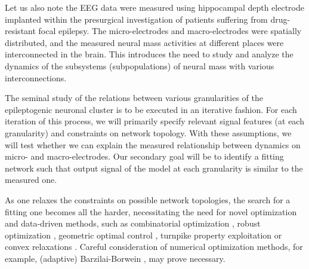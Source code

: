 \documentclass[a4paper,11pt]{scrartcl}
\begin{document}
Let us also note the EEG data \cite{Brazdil2017} were measured using hippocampal depth electrode implanted within the presurgical investigation of patients suffering from drug-resistant focal epilepsy. The micro-electrodes and macro-electrodes were spatially distributed, and the measured neural mass activities at different places were interconnected in the brain. This introduces the need to study and analyze the dynamics of the subsystems (subpopulations) of neural mass with various interconnections.

The seminal study of the relations between various granularities of the epileptogenic neuronal cluster is to be executed in an iterative fashion. For each iteration of this process, we will primarily specify relevant signal features (at each granularity) and constraints on network topology. With these assumptions, we will test whether we can explain the measured relationship between dynamics on micro- and macro-electrodes. Our secondary goal will be to identify a fitting network such that output signal of the model at each granularity is similar to the measured one.

As one relaxes the constraints on possible network topologies, the search for a fitting one becomes all the harder, necessitating the need for novel optimization and data-driven methods, such as combinatorial optimization \cite{Dai2011}, robust optimization \cite{Ben-Tal2009}, geometric optimal control \cite{Agrachev2004}, turnpike property exploitation \cite{Gugat2024} or convex relaxations \cite{Eltved2021}. Careful consideration of numerical optimization methods, for example, (adaptive) Barzilai-Borwein \cite{Zhou2024}, may prove necessary.


\end{document}
